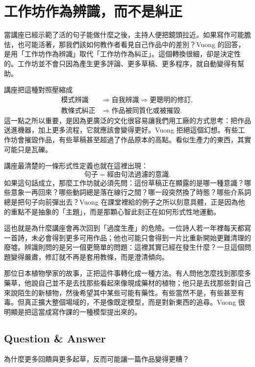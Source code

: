 \section{工作坊作為辨識，而不是糾正}

當講座已經示範了活的句子能做什麼之後，主持人便把鏡頭拉近。如果寫作可能膽怯，也可能活著，那我們該如何教作者看見自己作品中的差別？Vuong 的回答，是用「工作坊作為辨識」取代「工作坊作為糾正」。這個轉換很細，卻是決定性的。工作坊並不會只因為產生更多評論、更多草稿、更多程序，就自動變得有幫助。

講座把這種對照壓縮成
\begin{align}
\text{模式辨識} &\Longrightarrow \text{自我辨識} \Longrightarrow \text{更聰明的修訂},\\
\text{教條式糾正} &\Longrightarrow \text{作品被同質化或被摧毀}.
\end{align}
這一點之所以重要，是因為更廣泛的文化很容易讓我們用工廠的方式思考：把作品送進機器，加上更多流程，它就應該會變得更好。Vuong 拒絕這個幻想。有些工作坊會摧毀作品，有些草稿甚至超過了作品原本的高點。看似生產力的東西，其實可能只是瓦礫。

講座最清楚的一條形式性定義也就在這裡出現：
\begin{equation}
\text{句子} = \text{經由句法過濾的意識}.
\end{equation}
如果這句話成立，那麼工作坊就必須先問：這份草稿正在顯露的是哪一種意識？哪些意象一再回來？哪些動詞總是落在線行之間？哪一段突然換了時態？哪些介系詞總是把句子向前彈出去？Vuong 在課堂裡給的例子之所以刻意具體，正是因為他的重點不是抽象的「主題」，而是那顆心智此刻正在如何形式性地運動。

這也就是為什麼講座會再次回到「過度生產」的危險。一位詩人若一年裡每天都寫一首詩，未必會得到更多可用作品；他也可能只會得到一片比重新開始更難清理的廢墟。辨識則問的是另一個更簡單的問題：這裡其實已經在發生什麼？一旦這個問題變得嚴肅，修訂就不再是套用教條，而是澄清傾向。

那位日本植物學家的故事，正把這件事轉化成一種方法。有人問他怎麼找到那麼多藥草，他說自己並不是去找那些看起來像現成藥材的植物；他只是去找那些對自己來說陌生的新植物，然後希望其中某些可能有藥性。有些當然不是，有些甚至有毒。但真正擴大整個場域的，不是像既定模型，而是對新東西的追尋。Vuong 很明顯是把這當成寫作課的一種模型提出來的。

\subsection{Question \& Answer}

為什麼更多回饋與更多起草，反而可能讓一篇作品變得更糟？

